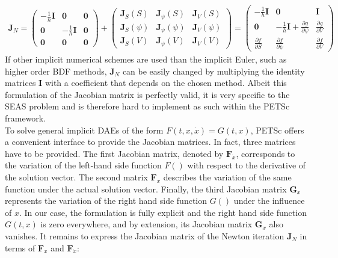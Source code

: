 \begin{align}
\label{eq:Jacobian_Newton_Iteration_extended_DAE}
\mathbf{J}_N = 
\begin{pmatrix} 
-\frac{1}{h}\mathbf{I} & \mathbf{0}            & \mathbf{0} \\ 
\mathbf{0}             &-\frac{1}{h}\mathbf{I} & \mathbf{0} \\ 
\mathbf{0}             & \mathbf{0}            & \mathbf{0} 
\end{pmatrix} + 
\begin{pmatrix}  
\mathbf{J}_S(S)    &  \mathbf{J}_\psi(S)    &  \mathbf{J}_V(S)    \\ 
\mathbf{J}_S(\psi) &  \mathbf{J}_\psi(\psi) &  \mathbf{J}_V(\psi) \\ 
\mathbf{J}_S(V)    &  \mathbf{J}_\psi(V)    &  \mathbf{J}_V(V)
\end{pmatrix} =
\begin{pmatrix} 
-\frac{1}{h}\mathbf{I}         &  \mathbf{0} 			            &
\mathbf{I}                     \\ 
\mathbf{0}                    & 
-\frac{1}{h}\mathbf{I} +  \frac{\partial g}{\partial \psi}       &  \frac{\partial g}{\partial V} \\ 
\frac{\partial f}{\partial S} & \frac{\partial f}{\partial \psi} &  \frac{\partial f}{\partial V} 
\end{pmatrix}
\end{align}
If other implicit numerical schemes are used than the implicit Euler, such as higher order BDF methods, $\mathbf{J}_N$ can be easily changed by multiplying the identity matrices $\mathbf{I}$ with a coefficient that depends on the chosen method. Albeit this formulation of the Jacobian matrix is perfectly valid, it is very specific to the SEAS problem and is therefore hard to implement as such within the PETSc framework. \\
To solve general implicit DAEs of the form $F(t,x,\dot{x}) = G(t,x)$, PETSc offers a convenient interface to provide the Jacobian matrices. In fact, three matrices have to be provided. The first Jacobian matrix, denoted by $\mathbf{F}_{\dot{x}}$, corresponds to the variation of the left-hand side function $F()$ with respect to the derivative of the solution vector. The second matrix $\mathbf{F}_x$ describes the variation of the same function under the actual solution vector. Finally, the third Jacobian matrix $\mathbf{G}_x$ represents the variation of the right hand side function $G()$ under the influence of $x$. In our case, the formulation is fully explicit and the right hand side function $G(t,x)$ is zero everywhere, and by extension, its Jacobian matrix $\mathbf{G}_x$ also vanishes. It remains to express the Jacobian matrix of the Newton iteration $\mathbf{J}_N$ in terms of $\mathbf{F}_x$ and $\mathbf{F}_{\dot{x}}$:
